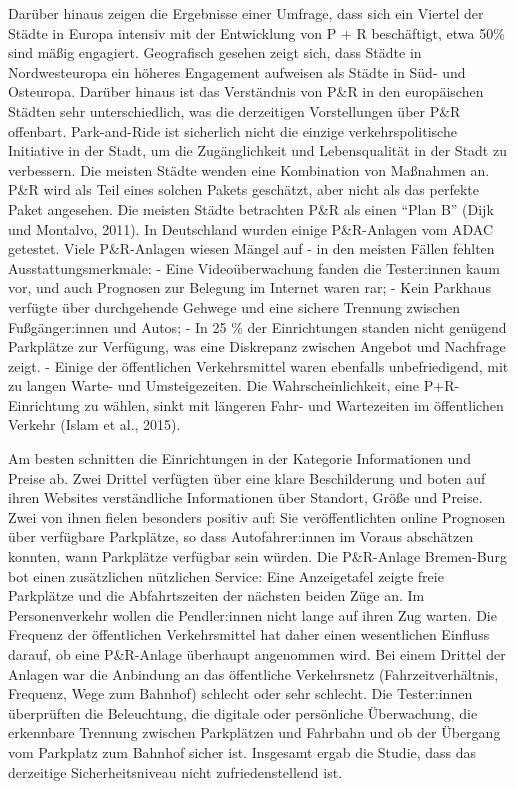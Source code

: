 \documentclass[
]{book}
\begin{document}
Darüber hinaus zeigen die Ergebnisse einer Umfrage, dass sich ein Viertel der Städte in Europa intensiv mit der Entwicklung von P + R beschäftigt, etwa 50\% sind mäßig engagiert. Geografisch gesehen zeigt sich, dass Städte in Nordwesteuropa ein höheres Engagement aufweisen als Städte in Süd- und Osteuropa. Darüber hinaus ist das Verständnis von P\&R in den europäischen Städten sehr unterschiedlich, was die derzeitigen Vorstellungen über P\&R offenbart. Park-and-Ride ist sicherlich nicht die einzige verkehrspolitische Initiative in der Stadt, um die Zugänglichkeit und Lebensqualität in der Stadt zu verbessern. Die meisten Städte wenden eine Kombination von Maßnahmen an. P\&R wird als Teil eines solchen Pakets geschätzt, aber nicht als das perfekte Paket angesehen. Die meisten Städte betrachten P\&R als einen ``Plan B'' (Dijk und Montalvo, 2011).
In Deutschland wurden einige P\&R-Anlagen vom ADAC getestet. Viele P\&R-Anlagen wiesen Mängel auf - in den meisten Fällen fehlten Ausstattungsmerkmale:
- Eine Videoüberwachung fanden die Tester:innen kaum vor, und auch Prognosen zur Belegung im Internet waren rar;
- Kein Parkhaus verfügte über durchgehende Gehwege und eine sichere Trennung zwischen Fußgänger:innen und Autos;
- In 25 \% der Einrichtungen standen nicht genügend Parkplätze zur Verfügung, was eine Diskrepanz zwischen Angebot und Nachfrage zeigt.
- Einige der öffentlichen Verkehrsmittel waren ebenfalls unbefriedigend, mit zu langen Warte- und Umsteigezeiten. Die Wahrscheinlichkeit, eine P+R-Einrichtung zu wählen, sinkt mit längeren Fahr- und Wartezeiten im öffentlichen Verkehr (Islam et al., 2015).

Am besten schnitten die Einrichtungen in der Kategorie Informationen und Preise ab. Zwei Drittel verfügten über eine klare Beschilderung und boten auf ihren Websites verständliche Informationen über Standort, Größe und Preise. Zwei von ihnen fielen besonders positiv auf: Sie veröffentlichten online Prognosen über verfügbare Parkplätze, so dass Autofahrer:innen im Voraus abschätzen konnten, wann Parkplätze verfügbar sein würden. Die P\&R-Anlage Bremen-Burg bot einen zusätzlichen nützlichen Service: Eine Anzeigetafel zeigte freie Parkplätze und die Abfahrtszeiten der nächsten beiden Züge an. Im Personenverkehr wollen die Pendler:innen nicht lange auf ihren Zug warten. Die Frequenz der öffentlichen Verkehrsmittel hat daher einen wesentlichen Einfluss darauf, ob eine P\&R-Anlage überhaupt angenommen wird. Bei einem Drittel der Anlagen war die Anbindung an das öffentliche Verkehrsnetz (Fahrzeitverhältnis, Frequenz, Wege zum Bahnhof) schlecht oder sehr schlecht. Die Tester:innen überprüften die Beleuchtung, die digitale oder persönliche Überwachung, die erkennbare Trennung zwischen Parkplätzen und Fahrbahn und ob der Übergang vom Parkplatz zum Bahnhof sicher ist. Insgesamt ergab die Studie, dass das derzeitige Sicherheitsniveau nicht zufriedenstellend ist.
\end{document}
